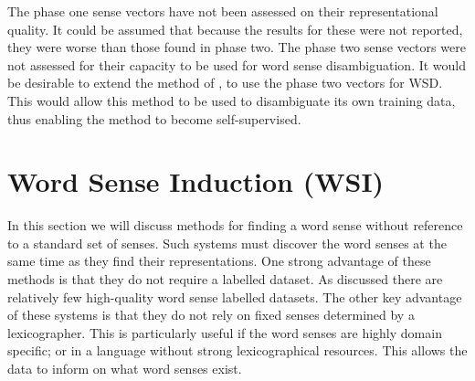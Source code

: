 {The phase one sense vectors have not been assessed on their representational quality.
It could be assumed that because the results for these were not reported, they were worse than those found in phase two.
The phase two sense vectors were not assessed for their capacity to be used for word sense disambiguation.
It would be desirable to extend the method of \textcite{Chen2014}, to use the phase two vectors for WSD.
This would allow this method to be used to disambiguate its own training data,
thus enabling the method to become self-supervised.


\section{Word Sense Induction (WSI)}\label{sec:word sense-induction-wsi}



In this section we will discuss methods for finding a word sense without reference to a standard set of senses.
Such systems must discover the word senses at the same time as they find their representations.
One strong advantage of these methods is that they do not require a labelled dataset.
As discussed there are relatively few high-quality word sense labelled datasets.
The other key advantage of these systems is that they do not rely on fixed senses determined by a lexicographer.
This is particularly useful if the word senses are highly domain specific;
or in a language without strong lexicographical resources.
This allows the data to inform on what word senses exist.

}
